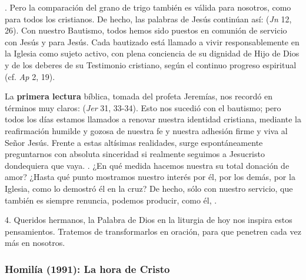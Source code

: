 \begin{body}
. Pero la comparación del grano de trigo también es válida para nosotros, como para todos los cristianos. De hecho, las palabras de Jesús continúan así:  (\textit{Jn} 12, 26). Con nuestro Bautismo, todos hemos sido puestos en comunión de servicio con Jesús y para Jesús. Cada bautizado está llamado a vivir responsablemente en la Iglesia como sujeto activo, con plena conciencia de su dignidad de Hijo de Dios y de los deberes de su Testimonio cristiano, según el continuo progreso espiritual (cf. \textit{Ap} 2, 19).

La \textbf{primera lectura} bíblica, tomada del profeta Jeremías, nos recordó en términos muy claros:  (\textit{Jer} 31, 33-34). Esto nos sucedió con el bautismo; pero todos los días estamos llamados a renovar nuestra identidad cristiana, mediante la reafirmación humilde y gozosa de nuestra fe y nuestra adhesión firme y viva al Señor Jesús. Frente a estas altísimas realidades, surge espontáneamente preguntarnos con absoluta sinceridad si realmente seguimos a Jesucristo dondequiera que vaya. . ¿En qué medida hacemos nuestra su total donación de amor? ¿Hasta qué punto mostramos nuestro interés por él, por los demás, por la Iglesia, como lo demostró él en la cruz? De hecho, sólo con nuestro servicio, que también es siempre renuncia, podemos producir, como él, .

4. Queridos hermanos, la Palabra de Dios en la liturgia de hoy nos inspira estos pensamientos. Tratemos de transformarlos en oración, para que penetren cada vez más en nosotros.

\end{body}

\label{b2-03-05-1982H}
\newpage

\subsubsection{Homilía (1991): La hora de Cristo}

